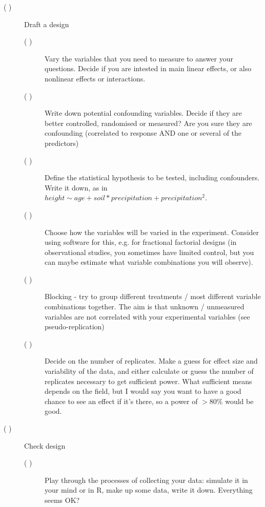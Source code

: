 \documentclass[a4paper,twoside]{tufte-book}\usepackage[]{graphicx}\usepackage[]{color}
\begin{document}
{\begin{mdframed}
\begin{description}
\item[( )] Draft a design

  \begin{description}

  \item[( )] Vary the variables that you need to measure to answer your questions. Decide if you are intested in main linear effects, or also nonlinear effects or interactions. 
  
  \item[( )] Write down potential confounding variables. Decide if they are better controlled, randomised or measured? Are you sure they are confounding (correlated to response AND one or several of the predictors)
  
  \item[( )] Define the statistical hypothesis to be tested, including confounders. Write it down, as in $height  \sim age + soil * precipitation + precipitation^2$. 
  
  \item[( )] Choose how the variables will be varied in the experiment. Consider using software for this, e.g. for fractional factorial designs (in observational studies, you sometimes have limited control, but you can maybe estimate what variable combinations you will observe).
  
  \item[( )] Blocking - try to group different treatments / most different variable combinations together. The aim is that unknown / unmeasured variables are not correlated with your experimental variables (see pseudo-replication)
  
  \item[( )] Decide on the number of replicates. Make a guess for effect size and variability of the data, and either calculate or guess the number of replicates necessary to get sufficient power. What sufficient means depends on the field, but I would say you want to have a good chance to see an effect if it's there, so a power of $>80\%$ would be good. 
  
  \end{description}
  
\item[( )] Check design
  
  \begin{description}
  
  \item[( )] Play through the processes of collecting your data: simulate it in your mind or in R, make up some data, write it down. Everything seems OK?
  

\end{description}
\end{description}
\end{mdframed}}
\end{document}
